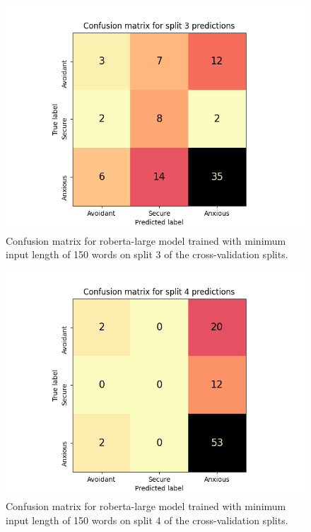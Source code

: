 \documentclass[12pt]{report}
\begin{document}
\begin{figure}
    \includegraphics[width=\textwidth]{figures/roberta-large_150_split3_confusion_matrix.png}
    \caption{Confusion matrix for roberta-large model trained with minimum input length of 150 words on split 3 of the cross-validation splits.}
    \label{fig: cm split3}
\end{figure}

\begin{figure}
    \includegraphics[width=\textwidth]{figures/roberta-large_150_split4_confusion_matrix.png}
    \caption{Confusion matrix for roberta-large model trained with minimum input length of 150 words on split 4 of the cross-validation splits.}
    \label{fig: cm split4}
\end{figure}
\end{document}
